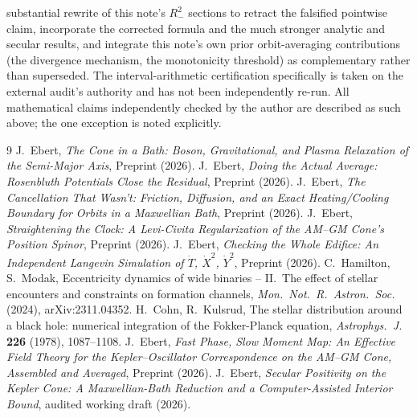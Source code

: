 \documentclass[12pt]{amsart}
\theoremstyle{plain}
\theoremstyle{remark}
\begin{document}
substantial rewrite of this note's $R_-^2$ sections to retract the falsified pointwise claim, incorporate the corrected formula and the much stronger analytic and secular results, and integrate this note's own prior orbit-averaging contributions (the divergence mechanism, the monotonicity threshold) as complementary rather than superseded. The interval-arithmetic certification specifically is taken on the external audit's authority and has not been independently re-run. All mathematical claims independently checked by the author are described as such above; the one exception is noted explicitly.

\begin{thebibliography}{9}
 J.~Ebert, \emph{The Cone in a Bath: Boson, Gravitational, and Plasma Relaxation of the Semi-Major Axis}, Preprint (2026).
 J.~Ebert, \emph{Doing the Actual Average: Rosenbluth Potentials Close the Residual}, Preprint (2026).
 J.~Ebert, \emph{The Cancellation That Wasn't: Friction, Diffusion, and an Exact Heating/Cooling Boundary for Orbits in a Maxwellian Bath}, Preprint (2026).
 J.~Ebert, \emph{Straightening the Clock: A Levi-Civita Regularization of the AM--GM Cone's Position Spinor}, Preprint (2026).
 J.~Ebert, \emph{Checking the Whole Edifice: An Independent Langevin Simulation of $\dot T$, $\dot X^2$, $\dot Y^2$}, Preprint (2026).
 C.~Hamilton, S.~Modak, Eccentricity dynamics of wide binaries -- II.\ The effect of stellar encounters and constraints on formation channels, \emph{Mon.\ Not.\ R.\ Astron.\ Soc.} (2024), arXiv:2311.04352.
 H.~Cohn, R.~Kulsrud, The stellar distribution around a black hole: numerical integration of the Fokker-Planck equation, \emph{Astrophys.\ J.} \textbf{226} (1978), 1087--1108.
 J.~Ebert, \emph{Fast Phase, Slow Moment Map: An Effective Field Theory for the Kepler--Oscillator Correspondence on the AM--GM Cone, Assembled and Averaged}, Preprint (2026).
 J.~Ebert, \emph{Secular Positivity on the Kepler Cone: A Maxwellian-Bath Reduction and a Computer-Assisted Interior Bound}, audited working draft (2026).
\end{thebibliography}
\end{document}
